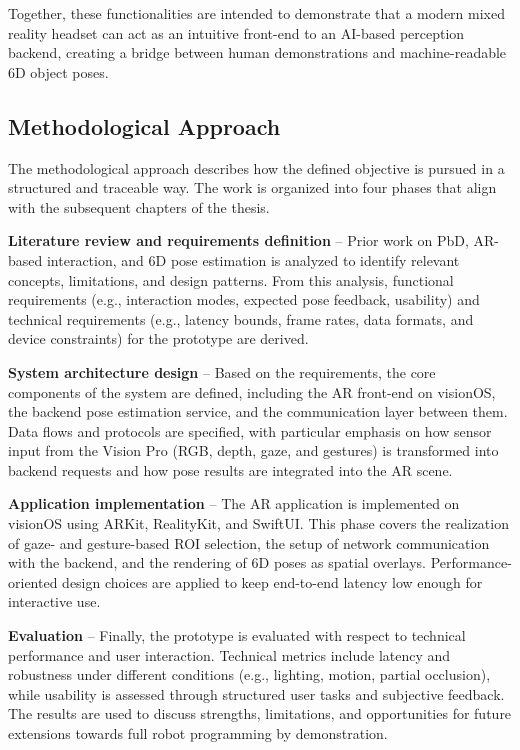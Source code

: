 Together, these functionalities are intended to demonstrate that a modern mixed reality headset can act as an intuitive front-end to an AI-based perception backend, creating a bridge between human demonstrations and machine-readable 6D object poses.

\subsection{Methodological Approach}

The methodological approach describes how the defined objective is pursued in a structured and traceable way. The work is organized into four phases that align with the subsequent chapters of the thesis.

\textbf{Literature review and requirements definition} – Prior work on PbD, AR-based interaction, and 6D pose estimation is analyzed to identify relevant concepts, limitations, and design patterns. From this analysis, functional requirements (e.g., interaction modes, expected pose feedback, usability) and technical requirements (e.g., latency bounds, frame rates, data formats, and device constraints) for the prototype are derived.

\textbf{System architecture design} – Based on the requirements, the core components of the system are defined, including the AR front-end on visionOS, the backend pose estimation service, and the communication layer between them. Data flows and protocols are specified, with particular emphasis on how sensor input from the Vision Pro (RGB, depth, gaze, and gestures) is transformed into backend requests and how pose results are integrated into the AR scene.

\textbf{Application implementation} – The AR application is implemented on visionOS using ARKit, RealityKit, and SwiftUI. This phase covers the realization of gaze- and gesture-based ROI selection, the setup of network communication with the backend, and the rendering of 6D poses as spatial overlays. Performance-oriented design choices are applied to keep end-to-end latency low enough for interactive use.

\textbf{Evaluation} – Finally, the prototype is evaluated with respect to technical performance and user interaction. Technical metrics include latency and robustness under different conditions (e.g., lighting, motion, partial occlusion), while usability is assessed through structured user tasks and subjective feedback. The results are used to discuss strengths, limitations, and opportunities for future extensions towards full robot programming by demonstration.
